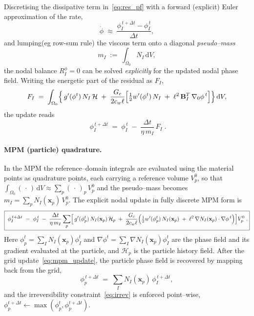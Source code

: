 \documentclass[12pt,a4paper]{article}
\newcommand{\bB}{\mathbf{B}}
\newcommand{\bx}{\mathbf{x}}
\newcommand{\dd}{\,\mathrm{d}}
\newcommand{\Dt}{\Delta t}
\begin{document}
	Discretising the dissipative term in~\eqref{eq:res_pf} with a forward (explicit)
	Euler approximation of the rate,
	\begin{equation}\label{eq:fwd_euler}
		\dot{\phi} \;\approx\; \frac{\phi_I^{\,t+\Dt}-\phi_I^{\,t}}{\Dt},
	\end{equation}
	and lumping(eg row-sum rule) the viscous term onto a diagonal \emph{pseudo--mass}
	\begin{equation}\label{eq:pseudomass}
		m_I \;:=\; \int_{\Omega_0} N_I\dd V ,
	\end{equation}
	the nodal balance $R_I^{\phi}=0$ can be solved \emph{explicitly} for the
	updated nodal phase field. Writing the energetic part of the residual as
	$F_I$,
	\begin{equation}\label{eq:Fnode}
		F_I \;=\; \int_{\Omega_0}\Bigl\{\,g'(\phi^t)\,N_I\,\mathcal{H}
		\;+\; \frac{G_c}{2c_w\ell}\Bigl[\tfrac{1}{2}w'(\phi^t)\,N_I
		\;+\; \ell^2\,\bB_I^{T}\,\nabla_0\phi^{\,t}\Bigr]\Bigr\}\dd V,
	\end{equation}
	the update reads
	\begin{equation}\label{eq:nodal_update}
		\boxed{\;
		\phi_I^{\,t+\Dt} \;=\; \phi_I^{\,t} \;-\; \frac{\Dt}{\eta\,m_I}\,F_I \;.}
	\end{equation}

	\paragraph{MPM (particle) quadrature.}
	In the MPM the reference--domain integrals are evaluated using the material
	points as quadrature points, each carrying a reference volume $V_p^0$, so that
	$\int_{\Omega_0}(\,\cdot\,)\dd V\approx\sum_p(\,\cdot\,)_p\,V_p^0$ and the
	pseudo--mass becomes $m_I=\sum_p N_I(\bx_p)\,V_p^0$. The explicit nodal update
	in fully discrete MPM form is
	\begin{equation}\label{eq:mpm_update}
		\boxed{\;
		\phi_I^{\,t+\Dt} \;=\; \phi_I^{\,t}
		\;-\; \frac{\Dt}{\eta\,m_I}\sum_{p}\Bigl[\,g'(\phi_p^{t})\,N_I(\bx_p)\,\mathcal{H}_p
		\;+\; \frac{G_c}{2c_w\ell}\Bigl(\tfrac12 w'(\phi_p^{t})\,N_I(\bx_p)
		\;+\; \ell^2\,\nabla N_I(\bx_p)\cdot\nabla\phi^{\,t}\Bigr)\Bigr]V_p^0 \;.}
	\end{equation}
	Here $\phi_p^{t}=\sum_I N_I(\bx_p)\phi_I^{t}$ and
	$\nabla\phi^{t}=\sum_I\nabla N_I(\bx_p)\phi_I^{t}$ are the phase field and its
	gradient evaluated at the particle, and $\mathcal{H}_p$ is the particle history
	field. After the grid update~\eqref{eq:mpm_update}, the particle phase field is
	recovered by mapping back from the grid,
	\begin{equation}\label{eq:p2phi}
		\phi_p^{\,t+\Dt} \;=\; \sum_I N_I(\bx_p)\,\phi_I^{\,t+\Dt},
	\end{equation}
	and the irreversibility constraint~\eqref{eq:irrev} is enforced
	point--wise, $\phi_p^{t+\Dt}\leftarrow\max(\phi_p^{t},\phi_p^{t+\Dt})$.
\end{document}

